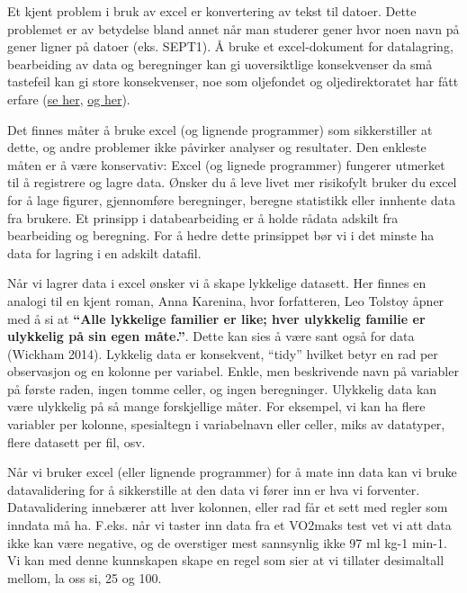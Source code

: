 \documentclass[
  letterpaper,
  DIV=11,
  numbers=noendperiod,
  oneside]{scrreprt}
\begin{document}
Et kjent problem i bruk av excel er konvertering av tekst til datoer.
Dette problemet er av betydelse bland annet når man studerer gener hvor
noen navn på gener ligner på datoer (eks. SEPT1). Å bruke et
excel-dokument for datalagring, bearbeiding av data og beregninger kan
gi uoversiktlige konsekvenser da små tastefeil kan gi store
konsekvenser, noe som oljefondet og oljedirektoratet har fått erfare
(\href{https://www.tu.no/artikler/oljemyndighetenes-excel-feil-ble-ikke-oppdaget-stortinget-apnet-barentshavet-sorost-med-regnefeil-pa-over-100-milliarder/405367}{se
her},
\href{https://www.ft.com/content/db864323-5b68-402b-8aa5-5c53a309acf1}{og
her}).

Det finnes måter å bruke excel (og lignende programmer) som
sikkerstiller at dette, og andre problemer ikke påvirker analyser og
resultater. Den enkleste måten er å være konservativ: Excel (og lignede
programmer) fungerer utmerket til å registrere og lagre data. Ønsker du
å leve livet mer risikofylt bruker du excel for å lage figurer,
gjennomføre beregninger, beregne statistikk eller innhente data fra
brukere. Et prinsipp i databearbeiding er å holde rådata adskilt fra
bearbeiding og beregning. For å hedre dette prinsippet bør vi i det
minste ha data for lagring i en adskilt datafil.

Når vi lagrer data i excel ønsker vi å skape lykkelige datasett. Her
finnes en analogi til en kjent roman, Anna Karenina, hvor forfatteren,
Leo Tolstoy åpner med å si at \textbf{``Alle lykkelige familier er like;
hver ulykkelig familie er ulykkelig på sin egen måte.''}. Dette kan sies
å være sant også for data (Wickham
2014).
Lykkelig data er konsekvent, ``tidy'' hvilket betyr en rad per
observasjon og en kolonne per variabel. Enkle, men beskrivende navn på
variabler på første raden, ingen tomme celler, og ingen beregninger.
Ulykkelig data kan være ulykkelig på så mange forskjellige måter. For
eksempel, vi kan ha flere variabler per kolonne, spesialtegn i
variabelnavn eller celler, miks av datatyper, flere datasett per fil,
osv.

Når vi bruker excel (eller lignende programmer) for å mate inn data kan
vi bruke datavalidering for å sikkerstille at den data vi fører inn er
hva vi forventer. Datavalidering innebærer att hver kolonnen, eller rad
får et sett med regler som inndata må ha. F.eks. når vi taster inn data
fra et VO2maks test vet vi att data ikke kan være negative, og de
overstiger mest sannsynlig ikke 97 ml kg-1 min-1. Vi kan med denne
kunnskapen skape en regel som sier at vi tillater desimaltall mellom, la
oss si, 25 og 100.
\end{document}
